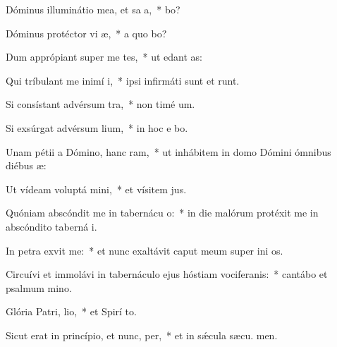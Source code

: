 \item Dóminus illuminátio mea, et sa a,~*  bo?
\item Dóminus protéctor vi æ,~* a quo bo?
\item Dum apprópiant super me tes,~* ut edant  as:
\item Qui tríbulant me inimí i,~* ipsi infirmáti sunt et runt.
\item Si consístant advérsum  tra,~* non timé  um.
\item Si exsúrgat advérsum  lium,~* in hoc e bo.
\item Unam pétii a Dómino, hanc ram,~* ut inhábitem in domo Dómini ómnibus diébus  æ:
\item Ut vídeam voluptá mini,~* et vísitem  jus.
\item Quóniam abscóndit me in tabernácu o:~* in die malórum protéxit me in abscóndito taberná i.
\item In petra exvit me:~* et nunc exaltávit caput meum super ini os.
\item Circuívi et immolávi in tabernáculo ejus hóstiam vociferanis:~* cantábo et psalmum  mino.
\item Glória Patri,  lio,~* et Spirí to.
\item Sicut erat in princípio, et nunc,  per,~* et in sǽcula sæcu. men.
